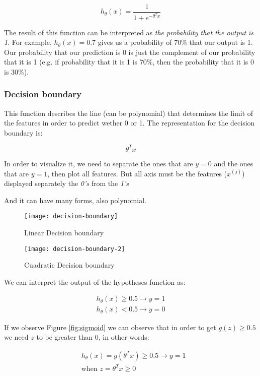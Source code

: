 $$h_{\theta}(x) = \frac{1}{1 + e^{-\theta^Tx}}$$

The result of this function can be interpreted as \textit{the probability that the output is 1}. For example, $h_{\theta}(x)=0.7$ gives us a probability of 70\% that our output is 1. Our probability that our prediction is 0 is just the complement of our probability that it is 1 (e.g. if probability that it is 1 is 70\%, then the probability that it is 0 is 30\%).


\subsubsection{Decision boundary}
This function describes the line (can be polynomial) that determines the limit of the features in order to predict wether 0 or 1. The representation for the decision boundary is:

$$\theta^Tx$$


In order to visualize it, we need to separate the ones that are $y = 0$ and the ones that are $y = 1$, then plot all features. But all axis must be the features ($x^{(j)}$) displayed separately the \textit{0's} from the \textit{1's}


And it can have many forms, also polynomial.


\begin{figure}[h]
	\begin{multicols}{2}
	\centering
	\texttt{[image: decision-boundary]}
	\caption{Linear Decision boundary}
	\label{fig:decision-boundary}

	\centering
	\texttt{[image: decision-boundary-2]}
	\caption{Cuadratic Decision boundary}
	\label{fig:decision-boundary-2}
	\end{multicols}
\end{figure}



We can interpret the output of the hypotheses function as:

\begin{align*}
	h_{\theta}(x) \ge 0.5 \to  y = 1 \\
	h_{\theta}(x) < 0.5 \to  y = 0
\end{align*}

If we observe Figure \ref{fig:sigmoid} we can observe that in order to get $g(z) \ge 0.5$ we need $z$ to be greater than $0$, in other words:

\begin{align*}
	& h_{\theta}(x) = g(\theta^Tx) \ge 0.5 \to  y = 1 \\
	& \text{when } z = \theta^Tx \ge 0
\end{align*}

